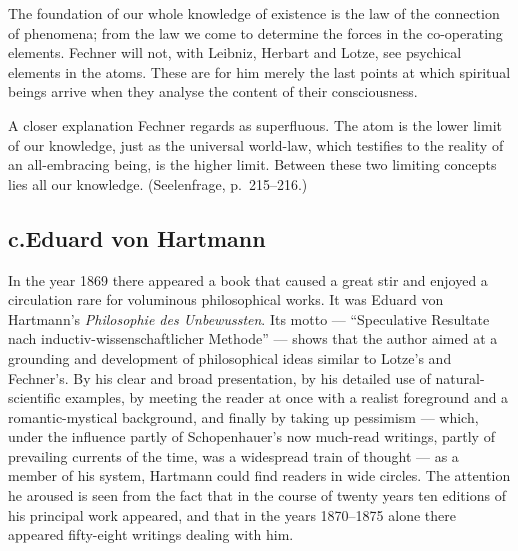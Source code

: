 \documentclass[12pt,a4paper]{book}
\newcommand{\opage}[1]{\marginnote{\footnotesize\textit{[#1]}}}
\begin{document}
The foundation of our whole knowledge of existence is the law \opage{535}of the connection
of phenomena; from the law we come to determine the forces in the co-operating
elements. Fechner will not, with Leibniz, Herbart and Lotze, see psychical
elements in the atoms. These are for him merely the last points at which
spiritual beings arrive when they analyse the content of their consciousness.

A closer explanation Fechner regards as superfluous. The atom is the lower limit
of our knowledge, just as the universal world-law, which testifies to the reality
of an all-embracing being, is the higher limit. Between these two limiting
concepts lies all our knowledge. (Seelenfrage, p.~215--216.)

\subsection*{c.\quad Eduard von Hartmann}

In the year 1869 there appeared a book that caused a great stir and enjoyed a
circulation rare for voluminous philosophical works. It was Eduard von Hartmann's
\textit{Philosophie des Unbewussten}. Its motto --- ``Speculative Resultate nach
inductiv-wissenschaftlicher Methode'' --- shows that the author aimed at a
grounding and development of philosophical ideas similar to Lotze's and
Fechner's. By his clear and broad presentation, by his detailed use of
natural-scientific examples, by meeting the reader at once with a realist
foreground and a romantic-mystical background, and finally by taking up pessimism
--- which, under the influence partly of Schopenhauer's now much-read writings,
partly of prevailing currents of the time, was a widespread train of thought ---
as a member of his system, Hartmann could find readers in wide circles. The
attention he aroused is seen from the fact that in the course of twenty years ten
editions of his principal work appeared, and that in the years 1870--1875 alone
there appeared fifty-eight writings dealing with him.
\end{document}
